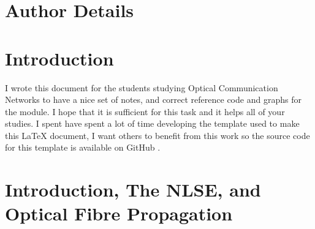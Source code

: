 \documentclass[colorlinks,11pt,a4paper,normalphoto,withhyper,ragged2e]{altareport}
\begin{document}
\MakeReportTitlePage


\setcounter{page}{1}






\section*{Author Details}
\makeauthordetails

\setcounter{tocdepth}{2} 
\tableofcontents %





\section*{Introduction}
I wrote this document for the students studying Optical Communication Networks to have a nice set of notes, and correct reference code and graphs for the module. I hope that it is sufficient for this task and it helps all of your studies. \linebreak
I spent have spent a lot of time developing the template used to make this {\LaTeX} document, I want others to benefit from this work so the source code for this template is available on GitHub \cite{latex_template_github}.
\newpage
{} %




\section{Introduction, The NLSE, and Optical Fibre Propagation}
\end{document}

